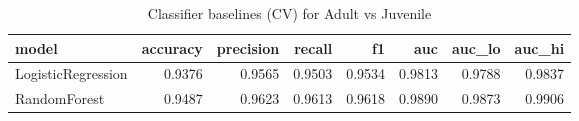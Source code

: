 \begin{table}
\caption{Classifier baselines (CV) for Adult vs Juvenile}
\label{tab:clf_adult_juvenile}
\begin{tabular}{lrrrrrrr}
\toprule
model & accuracy & precision & recall & f1 & auc & auc_lo & auc_hi \\
\midrule
LogisticRegression & 0.9376 & 0.9565 & 0.9503 & 0.9534 & 0.9813 & 0.9788 & 0.9837 \\
RandomForest & 0.9487 & 0.9623 & 0.9613 & 0.9618 & 0.9890 & 0.9873 & 0.9906 \\
\bottomrule
\end{tabular}
\end{table}
